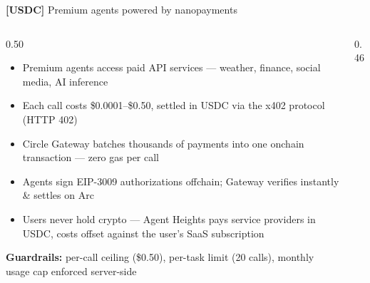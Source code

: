 \documentclass[aspectratio=169]{beamer}
\newcommand{\premtag}[1]{{\color{white}\textbf{[USDC]}}}
\begin{document}
\begin{frame}{\premtag{USDC} Premium agents powered by nanopayments}
  \begin{columns}[T]
    \begin{column}{0.50\textwidth}
      \begin{itemize}
        \footnotesize
        \item Premium agents access \alert{paid API services} --- weather, finance, social media, AI inference
        \item Each call costs \alert{\$0.0001--\$0.50}, settled in \alert{USDC} via the \alert{x402 protocol} (HTTP 402)
        \item \alert{Circle Gateway} batches thousands of payments into one onchain transaction --- \alert{zero gas} per call
        \item Agents sign \alert{EIP-3009 authorizations} offchain; Gateway verifies instantly \& settles on \alert{Arc}
        \item \alert{Users never hold crypto} --- Agent Heights pays service providers in USDC, costs offset against the user's SaaS subscription
      \end{itemize}
      \vspace{4pt}
      \begin{tcolorbox}[colback=usdc!8, colframe=usdc, sharp corners, boxrule=0.5pt]
        \scriptsize\color{textmain}
        \textbf{Guardrails:} per-call ceiling (\$0.50), per-task limit (20 calls), monthly usage cap enforced server-side
      \end{tcolorbox}
    \end{column}
    \begin{column}{0.46\textwidth}
      \centering
\end{column}
\end{columns}
\end{frame}
\end{document}
